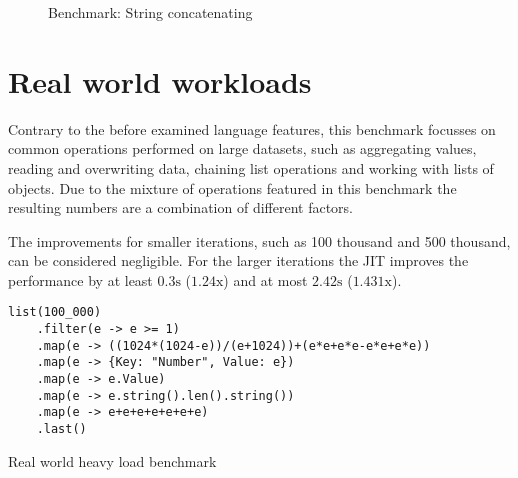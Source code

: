 \begin{figure}[H]
    \centering
    \caption{Benchmark: String concatenating}
    \label{chart:benchmark-string}
\end{figure}

\section{Real world workloads}

Contrary to the before examined language features, this benchmark focusses on
common operations performed on large datasets, such as aggregating values,
reading and overwriting data, chaining list operations and working with lists
of objects. Due to the mixture of operations featured in this benchmark the
resulting numbers are a combination of different factors.

The improvements for smaller iterations, such as 100 thousand and 500 thousand,
can be considered negligible. For the larger iterations the JIT improves the
performance by at least $0.3\textrm{s}$ ($1.24\textrm{x}$) and at most
$2.42\textrm{s}$ ($1.431\textrm{x}$).

\begin{listing}[H]
    \begin{verbatim}
list(100_000)
    .filter(e -> e >= 1)
    .map(e -> ((1024*(1024-e))/(e+1024))+(e*e+e*e-e*e+e*e))
    .map(e -> {Key: "Number", Value: e})
    .map(e -> e.Value)
    .map(e -> e.string().len().string())
    .map(e -> e+e+e+e+e+e+e)
    .last()
    \end{verbatim}
    \caption{Real world heavy load benchmark}
    \label{code:benchmark-realworld}
\end{listing}

